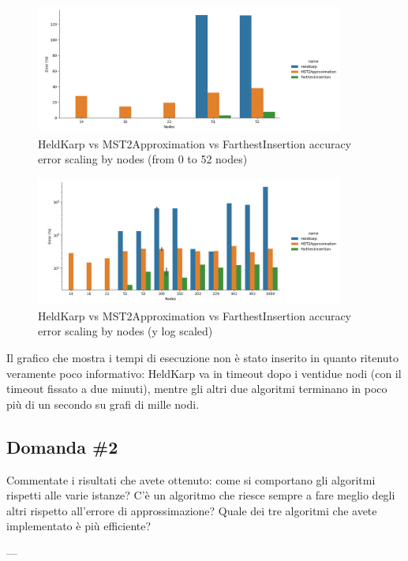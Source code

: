 \begin{figure}[H]
    \centering

    \includegraphics[width=0.9\textwidth]{./images/HeldKarp_vs_MST2Approximation_vs_FarthestInsertion__approximation_error__limited_to_52_nodes_.png}

    \caption{HeldKarp vs MST2Approximation vs FarthestInsertion accuracy error scaling by nodes (from 0 to 52 nodes)}
    \label{fig:heldkarp-mst2approx-farthestinsertion-accuracy-error-52-nodes}
\end{figure}

\begin{figure}[H]
    \centering

    \includegraphics[width=0.9\textwidth]{./images/HeldKarp_vs_MST2Approximation_vs_FarthestInsertion__approximation_error__y_log_scaled_.png}

    \caption{HeldKarp vs MST2Approximation vs FarthestInsertion accuracy error scaling by nodes (y log scaled)}
    \label{fig:heldkarp-mst2approx-farthestinsertion-accuracy-error}
\end{figure}

Il grafico che mostra i tempi di esecuzione non è stato inserito
in quanto ritenuto veramente poco informativo: HeldKarp va in 
timeout dopo i ventidue nodi (con il timeout fissato a due minuti),
mentre gli altri due algoritmi terminano in poco più di un secondo
su grafi di mille nodi. 

\subsection{Domanda \#2}

\begin{displayquote}
Commentate i risultati che avete ottenuto: come si comportano gli
algoritmi rispetti alle varie istanze? C'è un algoritmo che riesce
sempre a fare meglio degli altri rispetto all'errore di 
approssimazione? Quale dei tre algoritmi che avete implementato è
più efficiente?
\end{displayquote}


\noindent ---\\
